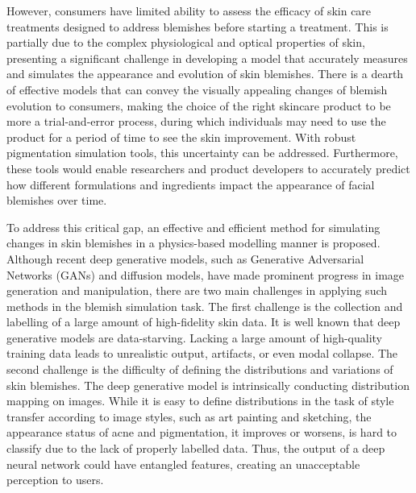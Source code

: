 \begin{spacing}{1.5}
However, consumers have limited ability to assess the efficacy of skin care treatments designed to address blemishes before starting a treatment\cite{doi:10.2352/EI.2023.35.7.IMAGE-276}. This is partially due to the complex physiological and optical properties of skin, presenting a significant challenge in developing a model that accurately measures and simulates the appearance and evolution of skin blemishes. There is a dearth of effective models that can convey the visually appealing changes of blemish evolution to consumers, making the choice of the right skincare product to be more a trial-and-error process, during which individuals may need to use the product for a period of time to see the skin improvement. With robust pigmentation simulation tools, this uncertainty can be addressed. Furthermore, these tools would enable researchers and product developers to accurately predict how different formulations and ingredients impact the appearance of facial blemishes over time.

To address this critical gap, an effective and efficient method for simulating changes in skin blemishes in a physics-based modelling manner is proposed. Although recent deep generative models, such as Generative Adversarial Networks\cite{goodfellowGenerativeAdversarialNetworks2014} (GANs) and diffusion models\cite{DBLP:conf/nips/HoJA20,rombach2021highresolution}, have made prominent progress in image generation and manipulation, there are two main challenges in applying such methods in the blemish simulation task. The first challenge is the collection and labelling of a large amount of high-fidelity skin data. It is well known that deep generative models are data-starving. Lacking a large amount of high-quality training data leads to unrealistic output, artifacts, or even modal collapse. The second challenge is the difficulty of defining the distributions and variations of skin blemishes. The deep generative model is intrinsically conducting distribution mapping on images. While it is easy to define distributions in the task of style transfer\cite{DBLP:conf/iclr/DumoulinSK17,DBLP:conf/iccv/ZhuPIE17, DBLP:journals/corr/GatysEB15a} according to image styles, such as art painting and sketching, the appearance status of acne and pigmentation, it improves or worsens, is hard to classify due to the lack of properly labelled data. Thus, the output of a deep neural network could have entangled features, creating an unacceptable perception to users.



\end{spacing}
